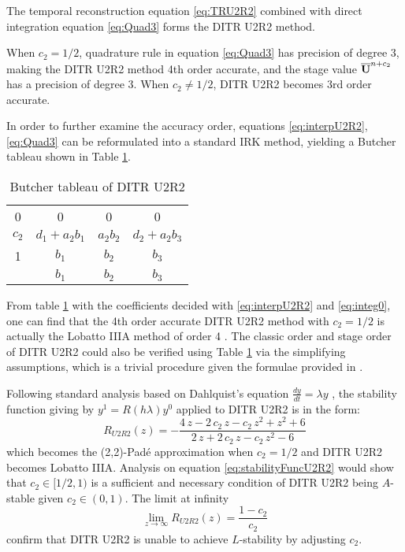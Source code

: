 \documentclass[preprint,12pt]{elsarticle}
\begin{document}
The temporal reconstruction equation \eqref{eq:TRU2R2}
combined with direct integration equation \eqref{eq:Quad3}
forms the DITR U2R2 method.

When $c_2=1/2$, quadrature rule in equation \eqref{eq:Quad3} has precision
of degree 3, making the DITR U2R2 method 4th order accurate,
and the stage value $\overline{\mathbf{U}}^{n+c_2}$ has a precision of degree 3.
When $c_2\neq1/2$, DITR U2R2 becomes 3rd order accurate.

In order to further examine the accuracy order,
equations \eqref{eq:interpU2R2}, \eqref{eq:Quad3}
can be reformulated into a standard IRK method,
yielding a Butcher tableau shown in Table \ref{tab:U2R2Butcher}.
\begin{table}[htbp]
    \centering
    \begin{tabular}{c|ccc}
        0     & 0              & 0        & 0              \\
        $c_2$ & $d_1 + a_2b_1$ & $a_2b_2$ & $d_2 + a_2b_3$ \\
        1     & $b_1$          & $b_2$    & $b_3$          \\ \hline
              & $b_1$          & $b_2$    & $b_3$
    \end{tabular}
    \caption{Butcher tableau of DITR U2R2}
    \label{tab:U2R2Butcher}
\end{table}

From table \ref{tab:U2R2Butcher} with the coefficients
decided with \eqref{eq:interpU2R2} and \eqref{eq:integ0},
one can find that the 4th order accurate
DITR U2R2 method with $c_2=1/2$
is actually the Lobatto IIIA method
of order 4 \cite{wanner1996solving}.
The classic order and stage order of DITR U2R2 could
also be verified using Table \ref{tab:U2R2Butcher} via
the simplifying assumptions, which is a trivial procedure
given the formulae provided in \cite{wanner1996solving}.

Following standard analysis based on Dahlquist's equation
$\frac{dy}{dt} = \lambda y$ \cite{wanner1996solving},
the stability function giving by $y^{1}=R(h\lambda)y^0$
applied to DITR U2R2 is in the form:
\begin{equation}
    \label{eq:stabilityFuncU2R2}
    R_{U2R2}(z) = -\frac{4\,z-2\,c_{2}\,z-c_{2}\,z^2+z^2+6}{2\,z+2\,c_{2}\,z-c_{2}\,z^2-6}
\end{equation}
which becomes the (2,2)-Pad{\'e} approximation when $c_2=1/2$ and
DITR U2R2 becomes Lobatto IIIA. 
Analysis on equation \eqref{eq:stabilityFuncU2R2} 
would show that $c_2\in[1/2,1)$ is a sufficient and necessary 
condition of DITR U2R2 being $A$-stable given $c_2\in(0,1)$. 
The limit at infinity
\begin{equation}
    \lim_{z\rightarrow\infty}R_{U2R2}(z) = \frac{1-c_2}{c_2}
\end{equation}
confirm that DITR U2R2 is unable to achieve $L$-stability 
by adjusting $c_2$.
\end{document}
